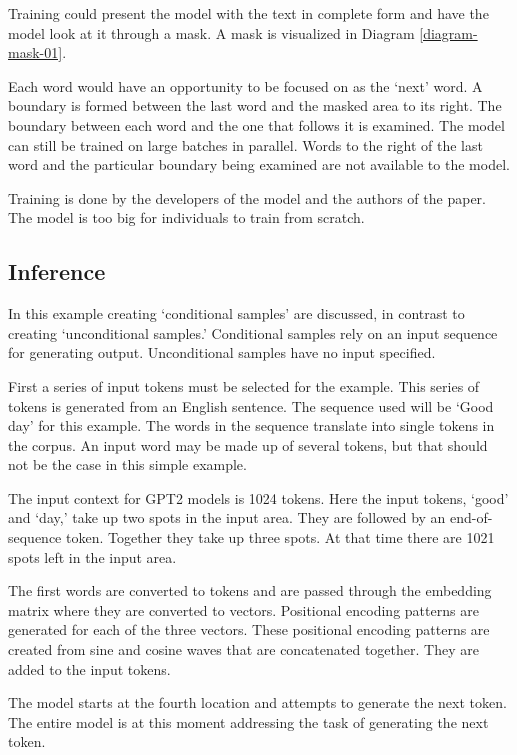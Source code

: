 Training could present the model with the text in complete form and have the model look at it through a mask. A mask is visualized in Diagram \ref{diagram-mask-01}.

Each word would have an opportunity to be focused on as the `next' word. A boundary is formed between the last word and the masked area to its right. The boundary between each word and the one that follows it is examined. The model can still be trained on large batches in parallel. Words to the right of the last word and the particular boundary being examined are not available to the model.

Training is done by the developers of the model and the authors of the paper. The model is too big for individuals to train from scratch. 

\subsection{Inference}

In this example creating `conditional samples' are discussed, in contrast to creating `unconditional samples.' Conditional samples rely on an input sequence for generating output. Unconditional samples have no input specified. %

First a series of input tokens must be selected for the example. This series of tokens is generated from an English sentence. The sequence used will be `Good day' for this example. The words in the sequence translate into single tokens in the corpus. An input word may be made up of several tokens, but that should not be the case in this simple example.

The input context for GPT2 models is 1024 tokens. Here the input tokens, `good' and `day,'  take up two spots in the input area. They are followed by an end-of-sequence token. Together they take up three spots. At that time there are 1021 spots left in the input area.

The first words are converted to tokens and are passed through the embedding matrix where they are converted to vectors. Positional encoding patterns are generated for each of the three vectors. These positional encoding patterns are created from sine and cosine waves that are concatenated together. They are added to the input tokens.

The model starts at the fourth location and attempts to generate the next token. The entire model is at this moment addressing the task of generating the next token.

